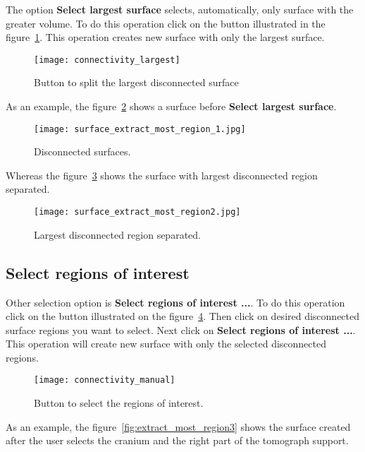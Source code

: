The option \textbf{Select largest surface} selects, automatically, only surface with the greater volume. To do this operation click on the button illustrated in the figure~\ref{fig:short_connectivity_largest}. This operation creates new surface with only the largest surface.

\begin{figure}[!htb]
\centering
\texttt{[image: connectivity\_largest]}
\caption{Button to split the largest disconnected surface}
\label{fig:short_connectivity_largest}
\end{figure}

As an example, the figure~\ref{fig:extract_most_region_1} shows a surface before \textbf{Select largest surface}.

\begin{figure}[!htb]
\centering
\texttt{[image: surface\_extract\_most\_region\_1.jpg]}
\caption{Disconnected surfaces.}
\label{fig:extract_most_region_1}
\end{figure}

Whereas the figure~\ref{fig:extract_most_region2} shows the surface with largest disconnected region separated.

\begin{figure}[!htb]
\centering
\texttt{[image: surface\_extract\_most\_region2.jpg]}
\caption{Largest disconnected region separated.}
\label{fig:extract_most_region2}
\end{figure}

\newpage

\subsection{Select regions of interest}

Other selection option is \textbf{Select regions of interest ...}. To do this operation click on the button illustrated on the figure~\ref{fig:short_connectivity_manual}. Then click on desired disconnected surface regions you want to select. Next click on \textbf{Select regions of interest ...}. This operation will create new surface with only the selected disconnected regions.

\begin{figure}[!htb]
\centering
\texttt{[image: connectivity\_manual]}
\caption{Button to select the regions of interest.}
\label{fig:short_connectivity_manual}
\end{figure}

As an example, the figure~\ref{fig:extract_most_region3} shows the surface created after the user selects the cranium and the right part of the tomograph support.

